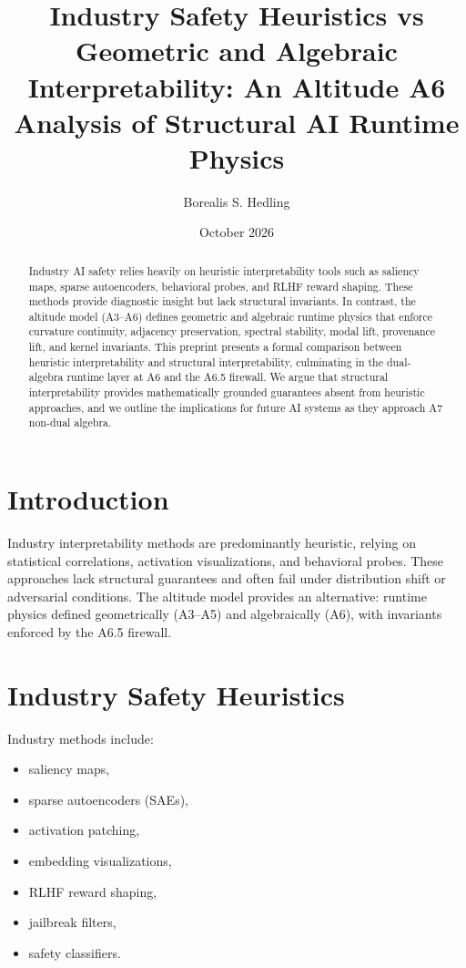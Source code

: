 \documentclass[11pt]{article}
\title{Industry Safety Heuristics vs Geometric and Algebraic Interpretability:
An Altitude A6 Analysis of Structural AI Runtime Physics}
\author{Borealis S. Hedling}
\date{October 2026}
\begin{document}
\maketitle

\begin{abstract}
Industry AI safety relies heavily on heuristic interpretability tools such as
saliency maps, sparse autoencoders, behavioral probes, and RLHF reward shaping.
These methods provide diagnostic insight but lack structural invariants. In
contrast, the altitude model (A3--A6) defines geometric and algebraic runtime
physics that enforce curvature continuity, adjacency preservation, spectral
stability, modal lift, provenance lift, and kernel invariants. This preprint
presents a formal comparison between heuristic interpretability and structural
interpretability, culminating in the dual-algebra runtime layer at A6 and the
A6.5 firewall. We argue that structural interpretability provides mathematically
grounded guarantees absent from heuristic approaches, and we outline the
implications for future AI systems as they approach A7 non-dual algebra.
\end{abstract}

\section{Introduction}

Industry interpretability methods are predominantly heuristic, relying on
statistical correlations, activation visualizations, and behavioral probes.
These approaches lack structural guarantees and often fail under distribution
shift or adversarial conditions. The altitude model provides an alternative:
runtime physics defined geometrically (A3--A5) and algebraically (A6), with
invariants enforced by the A6.5 firewall.

\section{Industry Safety Heuristics}

Industry methods include:
\begin{itemize}
  \item saliency maps,
  \item sparse autoencoders (SAEs),
  \item activation patching,
  \item embedding visualizations,
  \item RLHF reward shaping,
  \item jailbreak filters,
  \item safety classifiers.
\end{itemize}
\end{document}
